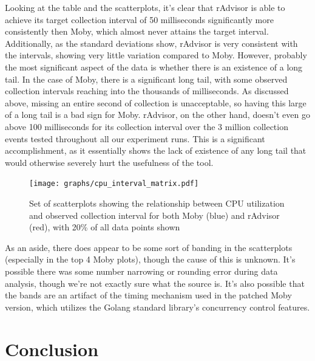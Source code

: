 \documentclass[a4paper,11pt]{article}
\newenvironment{aside}
    {\begin{mdframed}[
        leftline=false,rightline=false,leftmargin=2em,rightmargin=2em,
        innerleftmargin=0pt,innerrightmargin=0pt,linewidth=0.75pt,
        skipabove=7pt,skipbelow=7pt]\small}
    {\end{mdframed}}
\begin{document}
Looking at the table and the scatterplots, it's clear that
rAdvisor is able to achieve its target collection interval of 50 milliseconds
significantly more consistently then Moby, which almost never attains the target interval.
Additionally, as the standard deviations show,
rAdvisor is very consistent with the intervals,
showing very little variation compared to Moby.
However, probably the most significant aspect of the data is
whether there is an existence of a long tail.
In the case of Moby, there is a significant long tail,
with some observed collection intervals reaching into the thousands of milliseconds.
As discussed above, missing an entire second of collection is unacceptable,
so having this large of a long tail is a bad sign for Moby.
rAdvisor, on the other hand, doesn't even go above 100 milliseconds for its collection interval
over the 3 million collection events tested throughout all our experiment runs.
This is a significant accomplishment,
as it essentially shows the lack of existence of any long tail
that would otherwise severely hurt the usefulness of the tool.
    
\pagebreak
\begin{figure}[H]
    \vspace{-0.6em}
    \centering
    \texttt{[image: graphs/cpu\_interval\_matrix.pdf]}
    \vspace{0.7em}
    \caption{
        Set of scatterplots showing the relationship between CPU utilization and observed collection interval
        for both Moby (\textcolor{moby}{blue}) and rAdvisor (\textcolor{radvisor}{red}), with 20\% of all data points shown
    }
    \label{fig:interval_matrix}
    \vspace{1em}
\end{figure}

\begin{aside}
    As an aside, there does appear to be some sort of banding in the scatterplots (especially in the top 4 Moby plots),
    though the cause of this is unknown.
    It's possible there was some number narrowing or rounding error during data analysis,
    though we're not exactly sure what the source is.
    It's also possible that the bands are an artifact of the timing mechanism
    used in the patched Moby version, which utilizes the Golang standard library's concurrency control features.
\end{aside}


\section{Conclusion}
\end{document}

